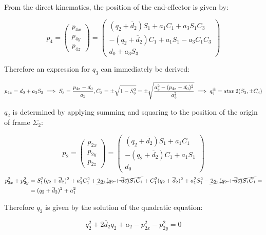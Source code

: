From the direct kinematics, the position of the end-effector is given by:

\begin{equation*}
p_{4}=\begin{pmatrix}
p_{4x}\\p_{4y}\\p_{4z}
\end{pmatrix}=\begin{pmatrix}
(q_2+\overline d_2)S_1+a_1C_1+a_3S_1C_3\\
-(q_2+\overline d_2)C_1+a_1S_1-a_3C_1C_3\\
d_0+a_3S_3
\end{pmatrix}
\end{equation*}

Therefore an expression for $q_3$ can immediately be derived:

\begin{equation*}
p_{4z}=d_0+a_3S_3\implies S_3=\frac{p_{4z}-d_0}{a_3}, C_3=\pm\sqrt{1-S_3^2}=\pm\sqrt{\frac{a_3^2-(p_{4z}-d_0)^2}{a_3^2}}\implies q_3^\pm=\atan2(S_3,\pm C_3)
\end{equation*}

$q_2$ is determined by applying summing and squaring to the position of the origin of frame $\Sigma_2$:

\begin{equation*}
p_2 = \begin{pmatrix}
p_{2x}\\p_{2y}\\p_{2z}
\end{pmatrix}=\begin{pmatrix}
(q_2+\overline d_2)S_1+a_1C_1\\
-(q_2+\overline d_2)C_1+a_1S_1\\
d_0
\end{pmatrix}
\end{equation*}
\begin{align*}
p_{2x}^2+p_{2y}^2&=S_1^2(q_2+\overline d_2)^2+a_1^2C_1^2+\cancel{2a_1(q_2+\overline d_2)S_1C_1}+C_1^2(q_2+\overline d_2)^2+a_1^2S_1^2-\cancel{2a_1(q_2+\overline d_2)S_1C_1}=\\
&=(q_2+\overline d_2)^2+a_1^2
\end{align*}

Therefore $q_2$ is given by the solution of the quadratic equation:

\begin{equation*}
q_2^2+2\overline d_2q_2+a_2-p_{2x}^2-p_{2y}^2=0
\end{equation*}

